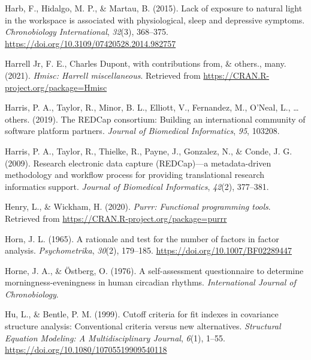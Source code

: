 \documentclass[
  english,
  man]{apa6}
\newlength{\cslhangindent}
\newlength{\cslentryspacingunit} %
\newenvironment{CSLReferences}[2] %
 {%
  \setlength{\parindent}{0pt}
  \ifodd #1
  \let\oldpar\par
  \def\par{\hangindent=\cslhangindent\oldpar}
  \fi
  \setlength{\parskip}{#2\cslentryspacingunit}
 }%
 {}
\begin{document}
\begin{CSLReferences}{1}{0}
\leavevmode{}%
Harb, F., Hidalgo, M. P., \& Martau, B. (2015). Lack of exposure to natural light in the workspace is associated with physiological, sleep and depressive symptoms. \emph{Chronobiology International}, \emph{32}(3), 368--375. \url{https://doi.org/10.3109/07420528.2014.982757}

\leavevmode{}%
Harrell Jr, F. E., Charles Dupont, with contributions from, \& others., many. (2021). \emph{Hmisc: Harrell miscellaneous}. Retrieved from \url{https://CRAN.R-project.org/package=Hmisc}

\leavevmode{}%
Harris, P. A., Taylor, R., Minor, B. L., Elliott, V., Fernandez, M., O'Neal, L., \ldots{} others. (2019). The REDCap consortium: Building an international community of software platform partners. \emph{Journal of Biomedical Informatics}, \emph{95}, 103208.

\leavevmode{}%
Harris, P. A., Taylor, R., Thielke, R., Payne, J., Gonzalez, N., \& Conde, J. G. (2009). Research electronic data capture (REDCap)---a metadata-driven methodology and workflow process for providing translational research informatics support. \emph{Journal of Biomedical Informatics}, \emph{42}(2), 377--381.

\leavevmode{}%
Henry, L., \& Wickham, H. (2020). \emph{Purrr: Functional programming tools}. Retrieved from \url{https://CRAN.R-project.org/package=purrr}

\leavevmode{}%
Horn, J. L. (1965). A rationale and test for the number of factors in factor analysis. \emph{Psychometrika}, \emph{30}(2), 179--185. \url{https://doi.org/10.1007/BF02289447}

\leavevmode{}%
Horne, J. A., \& Östberg, O. (1976). A self-assessment questionnaire to determine morningness-eveningness in human circadian rhythms. \emph{International Journal of Chronobiology}.

\leavevmode{}%
Hu, L., \& Bentle, P. M. (1999). Cutoff criteria for fit indexes in covariance structure analysis: {Conventional} criteria versus new alternatives. \emph{Structural Equation Modeling: A Multidisciplinary Journal}, \emph{6}(1), 1--55. \url{https://doi.org/10.1080/10705519909540118}


\end{CSLReferences}
\end{document}
